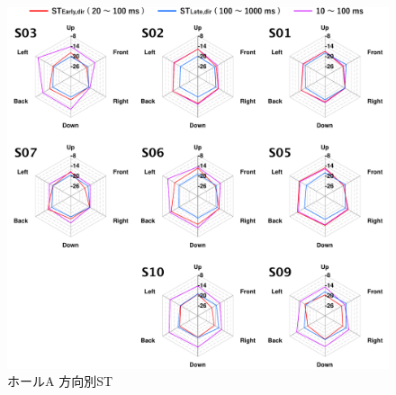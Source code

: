 \documentclass[11pt,a4j]{jreport}
\begin{document}
\begin{figure}[H]
  \centering
  \includegraphics[scale=.75]{images/realHallDirSt/allPoint/reshaped/a.pdf}
  \caption{ホールA 方向別ST}
  \label{fig:ホールA 方向別ST}
\end{figure}
\end{document}
